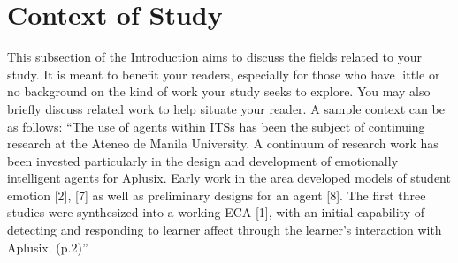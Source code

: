 
\section{Context of Study}

This subsection of the Introduction aims to discuss the fields related to your study. It is meant to benefit your readers, especially for those who have little or no background on the kind of work your study seeks to explore. You may also briefly discuss related work to help situate your reader.
A sample context can be as follows: “The use of agents within ITSs has been the subject of continuing research at the Ateneo de Manila University.  A continuum of research work has been invested particularly in the design and development of emotionally intelligent agents for Aplusix.  Early work in the area developed models of student emotion [2], [7] as well as preliminary designs for an agent [8]. The first three studies were synthesized into a working ECA [1], with an initial capability of detecting and responding to learner affect through the learner’s interaction with Aplusix. (p.2)”  

